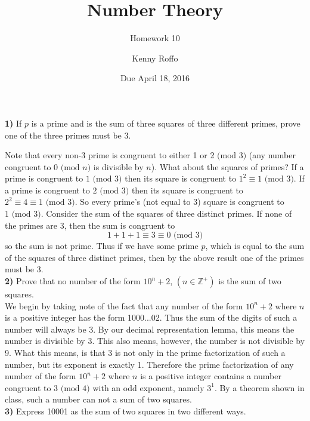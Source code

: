 \documentclass{scrartcl}
\title{Number Theory}
\subtitle{Homework 10}
\author{Kenny Roffo}
\date{Due April 18, 2016}
\renewcommand{\mod}[1]{\text{ (mod $#1$)}}
\begin{document}
\maketitle

\textbf{1)} If $p$ is a prime and is the sum of three squares of three different primes, prove one of the three primes must be 3.

Note that every non-3 prime is congruent to either 1 or 2$\mod{3}$ (any number congruent to 0$\mod{n}$ is divisible by $n$). What about the squares of primes? If a prime is congruent to $1\mod{3}$ then its square is congruent to $1^2\equiv1\mod{3}$. If a prime is congruent to $2\mod{3}$ then its square is congruent to $2^2\equiv4\equiv1\mod{3}$. So every prime's (not equal to 3) square is congruent to $1\mod{3}$. Consider the sum of the squares of three distinct primes. If none of the primes are 3, then the sum is congruent to
$$1 + 1 + 1 \equiv 3 \equiv 0 \mod{3}$$
so the sum is not prime. Thus if we have some prime $p$, which is equal to the sum of the squares of three distinct primes, then by the above result one of the primes must be 3.\\

\textbf{2)} Prove that no number of the form $10^n+2$, $(n\in\mathbb{Z}^+)$ is the sum of two squares.\\

We begin by taking note of the fact that any number of the form $10^n+2$ where $n$ is a positive integer has the form 1000...02. Thus the sum of the digits of such a number will always be 3. By our decimal representation lemma, this means the number is divisible by 3. This also means, however, the number is not divisible by 9. What this means, is that 3 is not only in the prime factorization of such a number, but its exponent is exactly 1. Therefore the prime factorization of any number of the form $10^n+2$ where $n$ is a positive integer contains a number congruent to 3$\mod{4}$ with an odd exponent, namely $3^1$. By a theorem shown in class, such a number can not a sum of two squares.\\

\textbf{3)} Express 10001 as the sum of two squares in two different ways.\\
\end{document}
